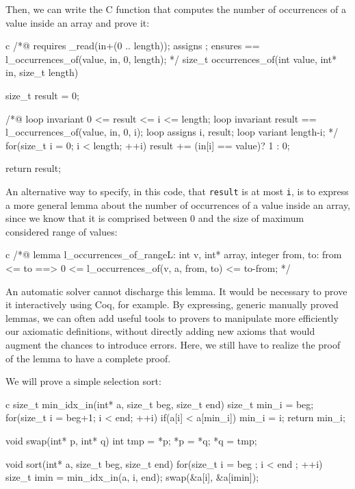 Then, we can write the C function that computes the number of
occurrences of a value inside an array and prove it:



\begin{CodeBlock}{c}
/*@
  requires \valid_read(in+(0 .. length));
  assigns  \nothing;
  ensures  \result == l_occurrences_of(value, in, 0, length);
*/
size_t occurrences_of(int value, int* in, size_t length){
  size_t result = 0;
  
  /*@
    loop invariant 0 <= result <= i <= length;
    loop invariant result == l_occurrences_of(value, in, 0, i);
    loop assigns i, result;
    loop variant length-i;
  */
  for(size_t i = 0; i < length; ++i)
    result += (in[i] == value)? 1 : 0;

  return result;
}
\end{CodeBlock}



An alternative way to specify, in this code, that \texttt{result} is at
most \texttt{i}, is to express a more general lemma about the number of
occurrences of a value inside an array, since we know that it is
comprised between 0 and the size of maximum considered range of values:



\begin{CodeBlock}{c}
/*@
lemma l_occurrences_of_range{L}:
  \forall int v, int* array, integer from, to:
    from <= to ==> 0 <= l_occurrences_of(v, a, from, to) <= to-from;
*/
\end{CodeBlock}



An automatic solver cannot discharge this lemma. It would be necessary
to prove it interactively using Coq, for example. By expressing, generic
manually proved lemmas, we can often add useful tools to provers to
manipulate more efficiently our axiomatic definitions, without directly
adding new axioms that would augment the chances to introduce errors.
Here, we still have to realize the proof of the lemma to have a complete
proof.





We will prove a simple selection sort:



\begin{CodeBlock}{c}
size_t min_idx_in(int* a, size_t beg, size_t end){
  size_t min_i = beg;
  for(size_t i = beg+1; i < end; ++i)
    if(a[i] < a[min_i]) min_i = i;
  return min_i;
}

void swap(int* p, int* q){
  int tmp = *p; *p = *q; *q = tmp;
}

void sort(int* a, size_t beg, size_t end){
  for(size_t i = beg ; i < end ; ++i){
    size_t imin = min_idx_in(a, i, end);
    swap(&a[i], &a[imin]);
  }
}
\end{CodeBlock}



